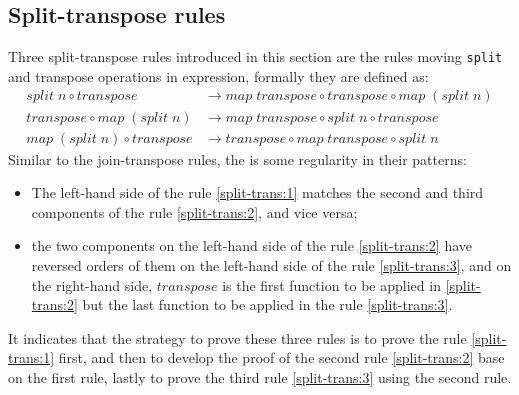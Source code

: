 \documentclass{l4proj}
\begin{document}
\subsection{Split-transpose rules}
\label{move:split}
Three split-transpose rules introduced in this section are the rules moving \texttt{split} and transpose operations in expression, formally they are defined as:
\begin{align}
    \label{split-trans:1}
    split\; n \circ transpose &\to map\; transpose \circ transpose \circ map\; (split\; n)\\
    \label{split-trans:2}
    transpose \circ map\; (split\; n) &\to map\; transpose \circ split\; n \circ transpose\\
    \label{split-trans:3}
    map\; (split\; n) \circ transpose &\to transpose \circ map\; transpose \circ split\; n
\end{align}
Similar to the join-transpose rules, the is some regularity in their patterns:
\begin{itemize}
    \item The left-hand side of the rule \ref{split-trans:1} matches the second and third components of the rule \ref{split-trans:2}, and vice versa;
    \item the two components on the left-hand side of the rule \ref{split-trans:2} have reversed orders of them on the left-hand side of the rule \ref{split-trans:3}, and on the right-hand side, $transpose$ is the first function to be applied in \ref{split-trans:2} but the last function to be applied in the rule \ref{split-trans:3}.
\end{itemize}
It indicates that the strategy to prove these three rules is to prove the rule \ref{split-trans:1} first, and then to develop the proof of the second rule \ref{split-trans:2} base on the first rule, lastly to prove the third rule \ref{split-trans:3} using the second rule.
\end{document}
